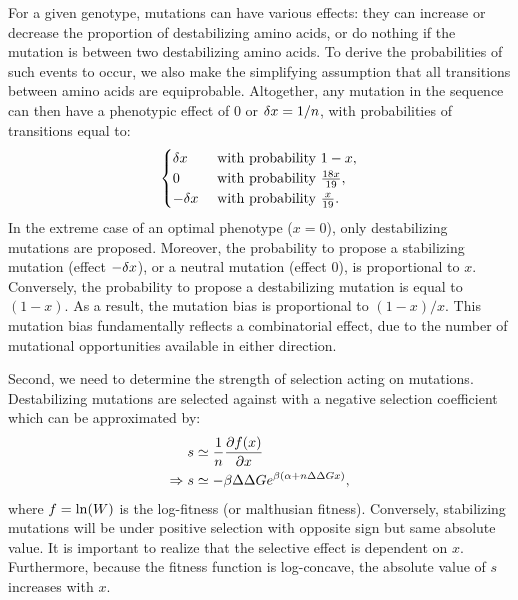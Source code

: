 For a given genotype, mutations can have various effects: they can increase or decrease the proportion of destabilizing amino acids, or do nothing if the mutation is between two destabilizing amino acids.
To derive the probabilities of such events to occur, we also make the simplifying assumption that all transitions between amino acids are equiprobable.
Altogether, any mutation in the sequence can then have a phenotypic effect of $0$ or $\delta x=1 /n$, with probabilities of transitions equal to:
\begin{gather}
    \begin{cases}
        \dx &\text{ with probability } 1-x, \\
        0 &\text{ with probability } \frac{18 x }{19}, \\
        -\dx &\text{ with probability } \frac{x}{19}.\\
    \end{cases} \label{eq:proba}
\end{gather}
In the extreme case of an optimal \gls{phenotype} ($x = 0$), only destabilizing mutations are proposed.
Moreover, the probability to propose a stabilizing mutation (effect $-\delta x$), or a \gls{neutral} mutation (effect $0$), is proportional to $x$.
Conversely, the probability to propose a destabilizing mutation is equal to $(1-x)$.
As a result, the mutation bias is proportional to $(1-x)/x$.
This mutation bias fundamentally reflects a combinatorial effect, due to the number of mutational opportunities available in either direction.

Second, we need to determine the strength of selection acting on mutations.
Destabilizing mutations are selected against with a negative selection coefficient which can be approximated by:
\begin{align}
    s & \simeq \frac{1}{\NbrSites}\frac{ \partial \logfit (x) }{\partial x} \label{eq:s} \\
    \Rightarrow s & \simeq - \beta \DeltaDeltaG e^{\beta (\DeltaGmin + \NbrSites \DeltaDeltaG x)}, \label{eq:s-unfolded}
\end{align}
where $ f = \ln (W)$ is the log-fitness (or malthusian fitness).
Conversely, stabilizing mutations will be under positive selection with opposite sign but same absolute value.
It is important to realize that the selective effect is dependent on $x$.
Furthermore, because the fitness function is log-concave, the absolute value of $s$ increases with $x$.

